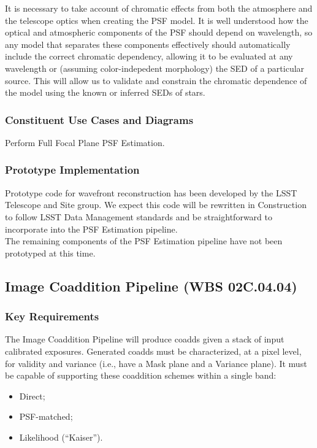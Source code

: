 \documentclass[12pt]{article}
\newcommand{\wbsCoadd}{WBS 02C.04.04}
\begin{document}
It is necessary to take account of chromatic effects from both the atmosphere and the telescope optics when creating the PSF model. It is well understood how the optical and atmospheric components of the PSF should depend on wavelength, so any model that separates these components effectively should automatically include the correct chromatic dependency, allowing it to be evaluated at any wavelength or (assuming color-indepedent morphology) the SED of a particular source.  This will allow us to validate and constrain the chromatic dependence of the model using the known or inferred SEDs of stars.

\subsubsection{Constituent Use Cases and Diagrams}

Perform Full Focal Plane PSF Estimation.

\subsubsection{Prototype Implementation}

Prototype code for wavefront reconstruction has been developed by the LSST Telescope and Site group. We expect this code will be rewritten in Construction to follow LSST Data Management standards and be straightforward to incorporate into the PSF Estimation pipeline.
\\

The remaining components of the PSF Estimation pipeline have not been prototyped at this time.

\clearpage

\subsection{Image Coaddition Pipeline (\wbsCoadd)}

\subsubsection{Key Requirements}

The Image Coaddition Pipeline will produce coadds given a stack of input calibrated exposures. Generated coadds must be characterized, at a pixel level, for validity and variance (i.e., have a Mask plane and a Variance plane). It must be capable of supporting these coaddition schemes within a single band:

\begin{itemize}
    \item{Direct;}
    \item{PSF-matched;}
    \item{Likelihood (``Kaiser'').}
\end{itemize}
\end{document}
